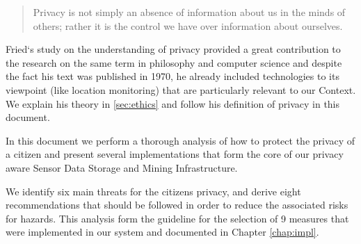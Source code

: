 \documentclass[external]{20120615_deliverable_template_ukob}
\theoremstyle{definition}
\begin{document}
\begin{quote}
Privacy is not simply an absence of information about us in the minds of others;
rather it is the control we have over information about ourselves.
\end{quote}

Fried`s study on the understanding of privacy provided a great
contribution to the research on the same term in philosophy and
computer science and despite the fact his text was published in 1970,
he already included technologies to its viewpoint (like location
monitoring) that are particularly relevant to our Context.  We explain
his theory in \ref{sec:ethics} and follow his definition of privacy in
this document.

In this document we perform a thorough analysis of how to protect the
privacy of a citizen and present several implementations that form the
core of our privacy aware Sensor Data Storage and Mining Infrastructure.

We identify six main threats for the citizens privacy, and derive
eight recommendations that should be followed in order to reduce the
associated risks for hazards.  This analysis form the guideline for
the selection of 9 measures that were implemented in our system and
documented in Chapter \ref{chap:impl}.



\clearpage




\end{document}
